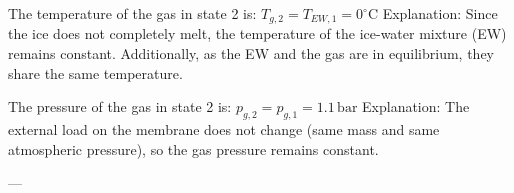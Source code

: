 The temperature of the gas in state 2 is:  
\( T_{g,2} = T_{EW,1} = 0^\circ \text{C} \)  
Explanation: Since the ice does not completely melt, the temperature of the ice-water mixture (EW) remains constant. Additionally, as the EW and the gas are in equilibrium, they share the same temperature.  

The pressure of the gas in state 2 is:  
\( p_{g,2} = p_{g,1} = 1.1 \, \text{bar} \)  
Explanation: The external load on the membrane does not change (same mass and same atmospheric pressure), so the gas pressure remains constant.  

---